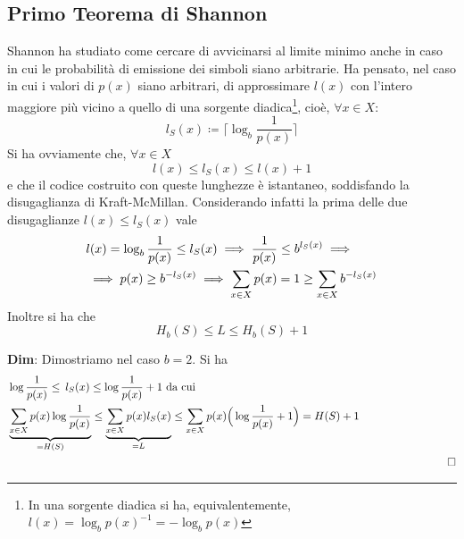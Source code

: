 \subsection{Primo Teorema di Shannon}
Shannon ha  studiato  come  cercare  di  avvicinarsi  al  limite  minimo  anche  in  caso  in  cui le  probabilità  di emissione dei simboli siano arbitrarie. Ha pensato, nel caso in cui i valori di $p(x)$ siano arbitrari, di approssimare $l(x)$ con l’intero maggiore più vicino a quello di una sorgente diadica\footnote{In una sorgente diadica si ha, equivalentemente, $l(x) = \log_b p(x)^{-1}= -\log_b p(x)$}, cio\`e, $\forall x \in X$:
\begin{equation}
l_S(x) \coloneqq \bigg \lceil \log_b \frac{1}{p(x)} \bigg \rceil
\end{equation}
Si ha ovviamente che, $\forall x \in X$
\begin{equation}
    l(x) \leq l_S(x) \leq l(x) + 1
\end{equation}
e che il codice costruito con queste lunghezze \`e istantaneo, soddisfando la disugaglianza di Kraft-McMillan. Considerando infatti la prima delle due disugaglianze $l(x) \leq l_S(x)$ vale
\begin{align*}
    &l(x) = \log_b \frac{1}{p(x)} \leq l_S(x) \implies \frac{1}{p(x)} \leq b^{l_S(x)} \implies \\
    &\implies p(x) \geq b^{-l_S(x)} \implies \sum_{x \in X} p(x) = 1 \geq \sum_{x \in X} b^{-l_S(x)}
\end{align*}
Inoltre si ha che 
\begin{equation}
    H_b(S) \leq L \leq H_b(S) + 1
\end{equation}
\begin{tcolorbox}
\textbf{Dim}: Dimostriamo nel caso $b=2$. Si ha
\begin{align*}
    &\log \frac{1}{p(x)} \leq \hspace{2pt} l_S(x) \leq \info{x} + 1 \text{ da cui}\\
    &\underbrace{\sumx p(x) \info{x}}_{=H(S)} \leq \underbrace{\sumx p(x) l_S(x) }_{=L} \leq \sumx p(x) \Big ( \info{x} + 1 \Big ) = H(S) + 1 \\
    &\hspace{400pt}\square
\end{align*}
\end{tcolorbox}

